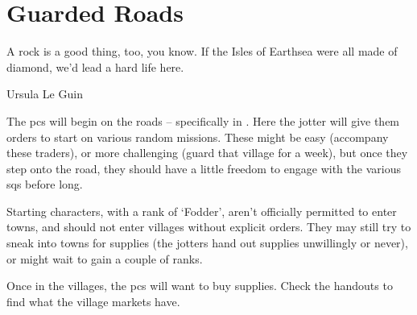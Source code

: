 \chapter{Guarded Roads}
\epigraph{A rock is a good thing, too, you know. If the Isles of Earthsea were all made of diamond, we'd lead a hard life here.}{Ursula Le Guin}

\noindent
The \glspl{pc} will begin on the roads -- specifically in .
Here the \gls{jotter} will give them orders to start on various random missions.%
These might be easy (accompany these traders), or more challenging (guard that \gls{village} for a week), but once they step onto the road, they should have a little freedom to engage with the various \glspl{sq} before long.

Starting characters, with a rank of `Fodder',%
aren't officially permitted to enter towns, and should not enter \glspl{village} without explicit orders.
They may still try to sneak into towns for supplies (the \glspl{jotter} hand out supplies unwillingly or never), or might wait to gain a couple of ranks.

Once in the \glspl{village}, the \glspl{pc} will want to buy supplies.
Check the handouts to find what the \gls{village} markets have.
